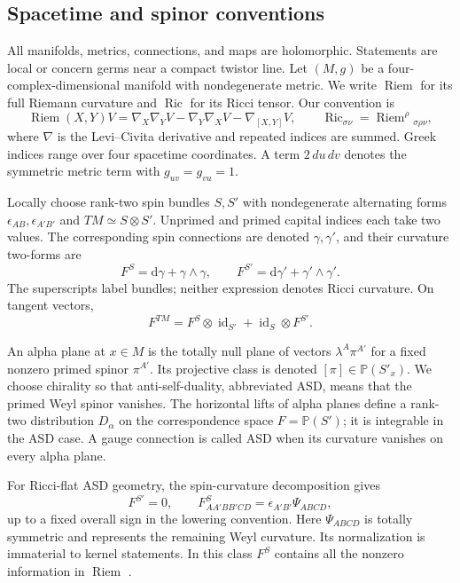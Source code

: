 \documentclass[11pt]{article}
\numberwithin{equation}{section}
\theoremstyle{definition}
\theoremstyle{remark}
\newcommand{\dd}{\mathrm d}
\newcommand{\Riem}{\operatorname{Riem}}
\newcommand{\Ric}{\operatorname{Ric}}
\newcommand{\id}{\operatorname{id}}
\begin{document}
\subsection{Spacetime and spinor conventions}

All manifolds, metrics, connections, and maps are holomorphic. Statements are local or concern germs near a compact twistor line. Let $(M,g)$ be a four-complex-dimensional manifold with nondegenerate metric. We write $\Riem$ for its full Riemann curvature and $\Ric$ for its Ricci tensor. Our convention is
\begin{equation}\label{eq:riem-convention}
\Riem(X,Y)V=\nabla_X\nabla_YV-\nabla_Y\nabla_XV-\nabla_{[X,Y]}V,
\qquad
\Ric_{\sigma\nu}=\Riem^\rho{}_{\sigma\rho\nu},
\end{equation}
where $\nabla$ is the Levi--Civita derivative and repeated indices are summed. Greek indices range over four spacetime coordinates. A term $2\,du\,dv$ denotes the symmetric metric term with $g_{uv}=g_{vu}=1$.

Locally choose rank-two spin bundles $S,S'$ with nondegenerate alternating forms $\epsilon_{AB},\epsilon_{A'B'}$ and $TM\simeq S\otimes S'$. Unprimed and primed capital indices each take two values. The corresponding spin connections are denoted $\gamma,\gamma'$, and their curvature two-forms are
\begin{equation}\label{eq:spin-curvature-definition}
F^S=\dd\gamma+\gamma\wedge\gamma,
\qquad F^{S'}=\dd\gamma'+\gamma'\wedge\gamma'.
\end{equation}
The superscripts label bundles; neither expression denotes Ricci curvature. On tangent vectors,
\begin{equation}\label{eq:tangent-spin-curvature}
F^{TM}=F^S\otimes\id_{S'}+\id_S\otimes F^{S'}.
\end{equation}

An alpha plane at $x\in M$ is the totally null plane of vectors $\lambda^A\pi^{A'}$ for a fixed nonzero primed spinor $\pi^{A'}$. Its projective class is denoted $[\pi]\in\mathbb P(S'_x)$. We choose chirality so that anti-self-duality, abbreviated ASD, means that the primed Weyl spinor vanishes. The horizontal lifts of alpha planes define a rank-two distribution $D_\alpha$ on the correspondence space $F=\mathbb P(S')$; it is integrable in the ASD case. A gauge connection is called ASD when its curvature vanishes on every alpha plane.

For Ricci-flat ASD geometry, the spin-curvature decomposition gives
\begin{equation}\label{eq:vacuum-spin-curvature}
F^{S'}=0,
\qquad
F^S_{AA'BB'CD}=\epsilon_{A'B'}\Psi_{ABCD},
\end{equation}
up to a fixed overall sign in the lowering convention. Here $\Psi_{ABCD}$ is totally symmetric and represents the remaining Weyl curvature. Its normalization is immaterial to kernel statements. In this class $F^S$ contains all the nonzero information in $\Riem$ \cite{AHS}.
\end{document}
